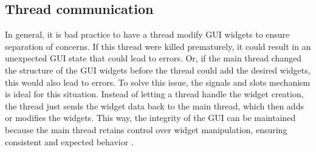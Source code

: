 \subsection{Thread communication}
\label{sub:thread_communication}

In general, it is bad practice to have a thread modify GUI widgets to ensure separation of concerns. If this thread were killed prematurely, it could result in an unexpected GUI state that could lead to errors. Or, if the main thread changed the structure of the GUI widgets before the thread could add the desired widgets, this would also lead to errors. To solve this issue, the signals and slots mechanism is ideal for this situation. Instead of letting a thread handle the widget creation, the thread just sends the widget data back to the main thread, which then adds or modifies the widgets. This way, the integrity of the GUI can be maintained because the main thread retains control over widget manipulation, ensuring consistent and expected behavior \cite{qt}.

